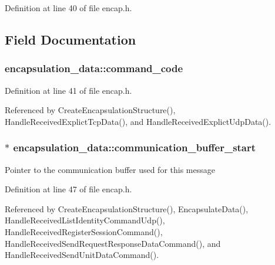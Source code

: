 \-Definition at line 40 of file encap.\-h.



\subsection{\-Field \-Documentation}
\hypertarget{structencapsulation__data_a502e32a96117d89036030eb537f67972}{
\subsubsection[{command\-\_\-code}]{ {\bf encapsulation\-\_\-data\-::command\-\_\-code}}}\label{d9/d42/structencapsulation__data_a502e32a96117d89036030eb537f67972}


\-Definition at line 41 of file encap.\-h.



\-Referenced by \-Create\-Encapsulation\-Structure(), \-Handle\-Received\-Explict\-Tcp\-Data(), and \-Handle\-Received\-Explict\-Udp\-Data().

\hypertarget{structencapsulation__data_a7cfd7e35e8eb9960ca8215d2ddc59f70}{
\subsubsection[{communication\-\_\-buffer\-\_\-start}]{$\ast$ {\bf encapsulation\-\_\-data\-::communication\-\_\-buffer\-\_\-start}}}\label{d9/d42/structencapsulation__data_a7cfd7e35e8eb9960ca8215d2ddc59f70}
\-Pointer to the communication buffer used for this message 

\-Definition at line 47 of file encap.\-h.



\-Referenced by \-Create\-Encapsulation\-Structure(), \-Encapsulate\-Data(), \-Handle\-Received\-List\-Identity\-Command\-Udp(), \-Handle\-Received\-Register\-Session\-Command(), \-Handle\-Received\-Send\-Request\-Response\-Data\-Command(), and \-Handle\-Received\-Send\-Unit\-Data\-Command().

